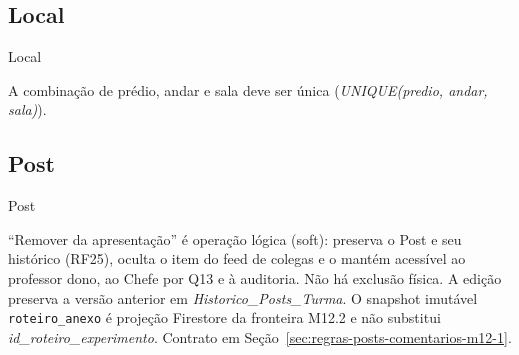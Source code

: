 \subsection{Local}
\begin{entidade}{Local}
\end{entidade}
\begin{regra}
A combinação de prédio, andar e sala deve ser única (\textit{UNIQUE(predio, andar, sala)}).
\end{regra}

\subsection{Post}
\begin{entidade}{Post}
\end{entidade}
\begin{explicacao}
``Remover da apresentação'' é operação lógica (soft): preserva o Post e seu
histórico (RF25), oculta o item do feed de colegas e o mantém acessível ao
professor dono, ao Chefe por Q13 e à auditoria. Não há exclusão física. A
edição preserva a versão anterior em \textit{Historico\_Posts\_Turma}. O
snapshot imutável \texttt{roteiro\_anexo} é projeção Firestore da fronteira
M12.2 e não substitui \textit{id\_roteiro\_experimento}. Contrato em
Seção~\ref{sec:regras-posts-comentarios-m12-1}.
\end{explicacao}

